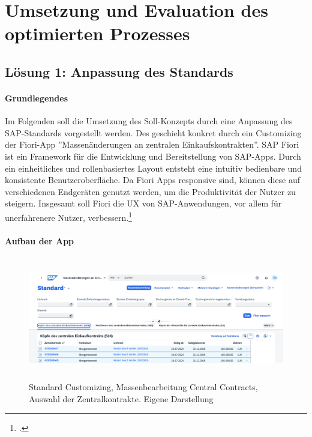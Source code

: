 \chapter{Umsetzung und Evaluation des optimierten Prozesses}



\section{Lösung 1: Anpassung des Standards} \label{sec:Kapitel41}

\subsubsection{Grundlegendes}

Im Folgenden soll die Umsetzung des Soll-Konzepts durch eine Anpassung des SAP-Standards vorgestellt werden. Des geschieht konkret durch ein Customizing der Fiori-App ''Massenänderungen an zentralen Einkaufskontrakten''. SAP Fiori ist ein Framework für die Entwicklung und Bereitstellung von SAP-Apps. Durch ein einheitliches und rollenbasiertes Layout entsteht eine intuitiv bedienbare und konsistente Benutzeroberfläche. Da Fiori Apps responsive sind, können diese auf verschiedenen Endgeräten genutzt werden, um die Produktivität der Nutzer zu steigern. Insgesamt soll Fiori die UX von SAP-Anwendungen, vor allem für unerfahrenere Nutzer, verbessern.\footcite[Vgl.][]{praxis_sap_fiori_allgemein_2024}

\subsubsection{Aufbau der App}

\begin{figure}[H]
    \centering
    \includegraphics[height=5.31cm]{Bilder/Praxisteil-S-Schritt-1.png}
    \caption[Standard Customizing, Massenbearbeitung Central Contracts, Auswahl der Zentralkontrakte]{Standard Customizing, Massenbearbeitung Central Contracts, Auswahl der Zentralkontrakte. Eigene Darstellung}
    \label{fig:PraxisSSchritt1}
\end{figure}

